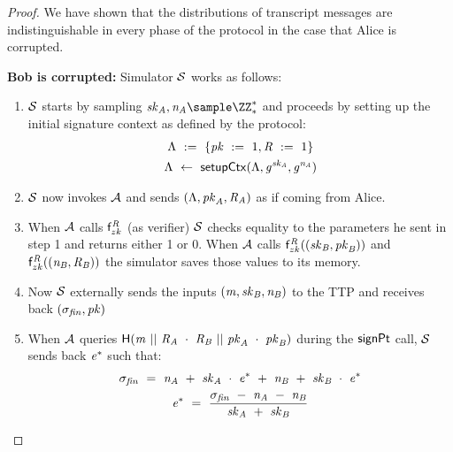 \begin{proof}
    We have shown that the distributions of transcript messages are indistinguishable in every phase of the protocol in the case that Alice is corrupted.

    \textbf{Bob is corrupted: } Simulator $\mathcal{S}$ works as follows:
    \begin{enumerate}
        \item $\mathcal{S}$ starts by sampling $\varSecKeyAlice, \varNonceAlice \sample \cnstIntegersPrimeWithoutZero{*}$ and proceeds by setting up the initial signature context as defined by the protocol:
        \begin{gather*}
            \Lambda ~:=~ \{ \mathit{pk} ~:=~ 1, \mathit{R} ~:=~ 1 \} \\
            \Lambda ~\leftarrow~ \mathsf{setupCtx}( \Lambda, \mathit{g}^{\mathit{sk}_{\mathit{A}}}, \mathit{g}^{\mathit{\mathit{n}_{\mathit{A}}}} ) \\
        \end{gather*}
        \item $\mathcal{S}$ now invokes $\mathcal{A}$ and sends $(\Lambda, \mathit{pk}_{\mathit{A}}, \mathit{R}_{\mathit{A}})$ as if coming from Alice.
        \item When $\mathcal{A}$ calls $\mathsf{f}^{\mathit{R}}_{zk}$ (as verifier) $\mathcal{S}$ checks equality to the parameters he sent in step 1 and returns either 1 or 0.
        When $\mathcal{A}$ calls $\mathsf{f}^{\mathit{R}}_{zk}((\mathit{sk}_{\mathit{B}}, \mathit{pk}_{\mathit{B}}))$ and $\mathsf{f}^{\mathit{R}}_{zk}((\mathit{\mathit{n}_{\mathit{B}}}, \mathit{R}_{\mathit{B}}))$ the simulator saves those values to its memory.
        \item Now $\mathcal{S}$ externally sends the inputs $(\mathit{m}, \mathit{sk}_{\mathit{B}}, \mathit{\mathit{n}_{\mathit{B}}})$ to the TTP and receives back $(\sigma_{\mathit{fin}}, \mathit{pk})$
        \item When $\mathcal{A}$ queries $\mathsf{H} (\mathit{m} ~||~ \mathit{R}_{\mathit{A}} ~\cdot~ \mathit{R}_{\mathit{B}} ~||~ \mathit{pk}_{\mathit{A}} ~\cdot~ \mathit{pk}_{\mathit{B}})$ during the $\mathsf{signPt}$ call, $\mathcal{S}$ sends back $\mathit{e}^*$ such that:
        \begin{gather*}
            \varSigFin \opEqNoQ \varNonceAlice \opAddScalar \varSecKeyAlice \opTimesScalar \funStar{\varSchnorrChallenge} \opAddScalar \varNonceBob \opAddScalar \varSecKeyBob \opTimesScalar \funStar{\varSchnorrChallenge} \\
            \funStar{\varSchnorrChallenge} \opEqNoQ \frac{\varSigFin \opSub \varNonceAlice \opSub \varNonceBob}{\varSecKeyAlice \opAddScalar \varSecKeyBob}

\end{gather*}
\end{enumerate}
\end{proof}
